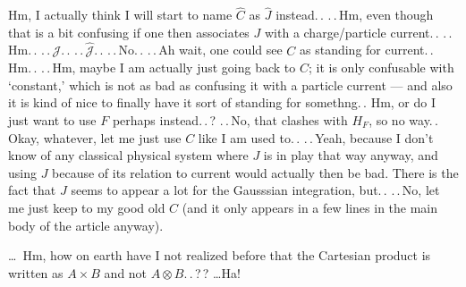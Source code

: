 \documentclass{report}
\begin{document}
Hm, I actually think I will start to name $\hat C$ as $\hat J$ instead.\,. 
.\,.\,Hm, even though that is a bit confusing if one then associates $J$ with a charge/particle current.\,. .\,.\,Hm.\,. .\,.\,$\mathcal{J}$.\,. .\,.\,$\hat{\mathcal{J}}$.\,. .\,.\,No.\,. .\,.\,Ah wait, one could see $C$ as standing for current.\,. Hm.\,. .\,.\,Hm, maybe I am actually just going back to $C$; it is only confusable with `constant,' which is not as bad as confusing it with a particle current --- and also it is kind of nice to finally have it sort of standing for somethng.\,. Hm, or do I just want to use $F$ perhaps instead.\,.\,? .\,.\,No, that clashes with $H_F$, so no way.\,. Okay, whatever, let me just use $C$ like I am used to.\,. .\,.\,Yeah, because I don't know of any classical physical system where $J$ is in play that way anyway, and using $J$ because of its relation to current would actually then be bad. There is the fact that $J$ seems to appear a lot for the Gausssian integration, but.\,. .\,.\,No, let me just keep to my good old $C$ (and it only appears in a few lines in the main body of the article anyway). 


\ldots\ Hm, how on earth have I not realized before that the Cartesian product is written as $A \times B$ and not $A \otimes B$.\,.\,?\,? \ldots Ha!
\end{document}
